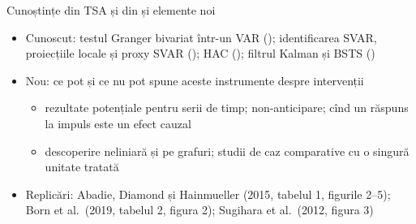 \begin{frame}{Cunoștințe din TSA și din  și elemente noi}
\itemsize{\small}
\begin{itemize}
    \item \hypertarget{c14known}{}Cunoscut: testul Granger bivariat într-un VAR (); identificarea SVAR, proiecțiile locale și proxy SVAR (); HAC (); filtrul Kalman și BSTS ()
    \item Nou: ce pot și ce nu pot spune aceste instrumente despre intervenții
    \begin{itemize}
        \item rezultate potențiale pentru serii de timp; non-anticipare; cînd un răspuns la impuls este un efect cauzal
        \item descoperire neliniară și pe grafuri; studii de caz comparative cu o singură unitate tratată
    \end{itemize}
    \item Replicări: Abadie, Diamond și Hainmueller (2015, tabelul 1, figurile 2--5); Born et al.\ (2019, tabelul 2, figura 2); Sugihara et al.\ (2012, figura 3)
\end{itemize}
\end{frame}

